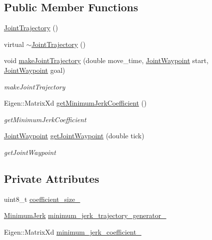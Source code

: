 \subsection*{Public Member Functions}
\begin{DoxyCompactItemize}
\item 
\hyperlink{classrobotis__manipulator_1_1_joint_trajectory_abeaf864dbc1fa619ca8870c03f36f8b5}{Joint\+Trajectory} ()
\item 
virtual \hyperlink{classrobotis__manipulator_1_1_joint_trajectory_a971255bd9c193d9c333f1c095692f7e3}{$\sim$\+Joint\+Trajectory} ()
\item 
void \hyperlink{classrobotis__manipulator_1_1_joint_trajectory_a27165ae6c8bc5ffd3d431ac03c77cddb}{make\+Joint\+Trajectory} (double move\+\_\+time, \hyperlink{namespacerobotis__manipulator_a4456fd8b14e1f6b7733a77837dfe9339}{Joint\+Waypoint} start, \hyperlink{namespacerobotis__manipulator_a4456fd8b14e1f6b7733a77837dfe9339}{Joint\+Waypoint} goal)
\begin{DoxyCompactList}\small\item\em make\+Joint\+Trajectory \end{DoxyCompactList}\item 
Eigen\+::\+Matrix\+Xd \hyperlink{classrobotis__manipulator_1_1_joint_trajectory_a2a471ffc50baf5d83bd857ea57ed3ccd}{get\+Minimum\+Jerk\+Coefficient} ()
\begin{DoxyCompactList}\small\item\em get\+Minimum\+Jerk\+Coefficient \end{DoxyCompactList}\item 
\hyperlink{namespacerobotis__manipulator_a4456fd8b14e1f6b7733a77837dfe9339}{Joint\+Waypoint} \hyperlink{classrobotis__manipulator_1_1_joint_trajectory_aef1a0eaac83af6599f2bef674d299f4c}{get\+Joint\+Waypoint} (double tick)
\begin{DoxyCompactList}\small\item\em get\+Joint\+Waypoint \end{DoxyCompactList}\end{DoxyCompactItemize}
\subsection*{Private Attributes}
\begin{DoxyCompactItemize}
\item 
uint8\+\_\+t \hyperlink{classrobotis__manipulator_1_1_joint_trajectory_abfc3d7ff3a5789f818ce2a483118458a}{coefficient\+\_\+size\+\_\+}
\item 
\hyperlink{classrobotis__manipulator_1_1_minimum_jerk}{Minimum\+Jerk} \hyperlink{classrobotis__manipulator_1_1_joint_trajectory_a7138717ca5cd53ca07e3ff9c68494170}{minimum\+\_\+jerk\+\_\+trajectory\+\_\+generator\+\_\+}
\item 
Eigen\+::\+Matrix\+Xd \hyperlink{classrobotis__manipulator_1_1_joint_trajectory_a74b431132c75c6840b70ea62f65d3c48}{minimum\+\_\+jerk\+\_\+coefficient\+\_\+}
\end{DoxyCompactItemize}


